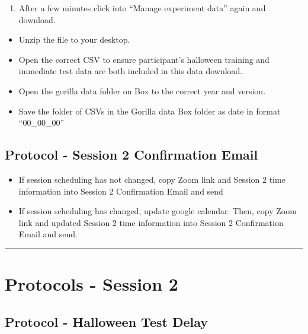 \documentclass[]{book}
\providecommand{\tightlist}{%
  \setlength{\itemsep}{0pt}\setlength{\parskip}{0pt}}
\begin{document}
\begin{enumerate}
\def\labelenumi{\arabic{enumi}.}
\setcounter{enumi}{4}
\tightlist
\item
  After a few minutes click into ``Manage experiment data'' again and download.
\end{enumerate}

\begin{itemize}
\tightlist
\item
  Unzip the file to your desktop.
\item
  Open the correct CSV to ensure participant's halloween training and immediate test data are both included in this data download.
\item
  Open the gorilla data folder on Box to the correct year and version.
\item
  Save the folder of CSVs in the Gorilla data Box folder as date in format ``00\_00\_00''
\end{itemize}

\hypertarget{protocol---session-2-confirmation-email}{%
\subsection{Protocol - Session 2 Confirmation Email}\label{protocol---session-2-confirmation-email}}

\begin{itemize}
\tightlist
\item
  If session scheduling has not changed, copy Zoom link and Session 2 time information into Session 2 Confirmation Email and send
\item
  If session scheduling has changed, update google calendar. Then, copy Zoom link and updated Session 2 time information into Session 2 Confirmation Email and send.
\end{itemize}

\begin{center}\rule{0.5\linewidth}{0.5pt}\end{center}

\hypertarget{protocols---session-2}{%
\section{Protocols - Session 2}\label{protocols---session-2}}

\hypertarget{protocol---halloween-test-delay}{%
\subsection{Protocol - Halloween Test Delay}\label{protocol---halloween-test-delay}}
\end{document}
